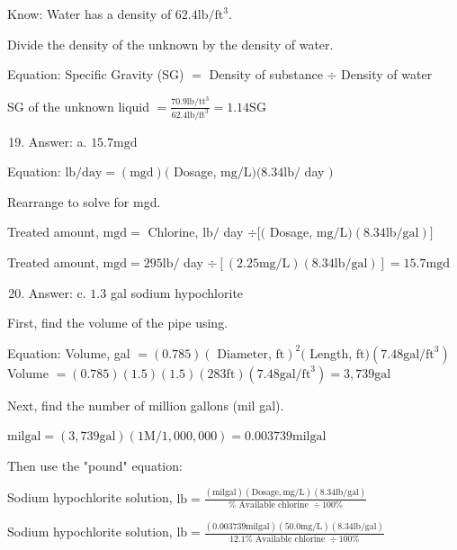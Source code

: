 \documentclass[10pt]{article}
\begin{document}
Know: Water has a density of $62.4 \mathrm{lb} / \mathrm{ft}^{3}$.

Divide the density of the unknown by the density of water.

Equation: Specific Gravity (SG) $=$ Density of substance $\div$ Density of water

SG of the unknown liquid $=\frac{70.9 \mathrm{lb} / \mathrm{tt}^{3}}{62.4 \mathrm{lb} / \mathrm{ft}^{3}}=1.14 \mathrm{SG}$

\begin{enumerate}
  \setcounter{enumi}{18}
  \item Answer: a. $15.7 \mathrm{mgd}$
\end{enumerate}

Equation: $\mathrm{lb} / \mathrm{day}=(\mathrm{mgd})($ Dosage, $\mathrm{mg} / \mathrm{L})(8.34 \mathrm{lb} /$ day $)$

Rearrange to solve for mgd.

Treated amount, $\mathrm{mgd}=$ Chlorine, $\mathrm{lb} /$ day $\div[($ Dosage, $\mathrm{mg} / \mathrm{L})(8.34 \mathrm{lb} / \mathrm{gal})]$

Treated amount, $\mathrm{mgd}=295 \mathrm{lb} /$ day $\div[(2.25 \mathrm{mg} / \mathrm{L})(8.34 \mathrm{lb} / \mathrm{gal})]=15.7 \mathrm{mgd}$

\begin{enumerate}
  \setcounter{enumi}{19}
  \item Answer: c. $1.3$ gal sodium hypochlorite
\end{enumerate}

First, find the volume of the pipe using.

Equation: Volume, gal $=(0.785)(\text { Diameter, } \mathrm{ft})^{2}($ Length, $\mathrm{ft})\left(7.48 \mathrm{gal} / \mathrm{ft}^{3}\right)$ Volume $=(0.785)(1.5)(1.5)(283 \mathrm{ft})\left(7.48 \mathrm{gal} / \mathrm{ft}^{3}\right)=3,739 \mathrm{gal}$

Next, find the number of million gallons (mil gal).

$\mathrm{mil} \mathrm{gal}=(3,739 \mathrm{gal})(1 \mathrm{M} / 1,000,000)=0.003739 \mathrm{mil} \mathrm{gal}$

Then use the "pound" equation:

Sodium hypochlorite solution, $\mathrm{lb}=\frac{(\mathrm{mil} \mathrm{gal})(\mathrm{Dosage}, \mathrm{mg} / \mathrm{L})(8.34 \mathrm{lb} / \mathrm{gal})}{\% \text { Available chlorine } \div 100 \%}$

Sodium hypochlorite solution, $\mathrm{lb}=\frac{(0.003739 \mathrm{mil} \mathrm{gal})(50.0 \mathrm{mg} / \mathrm{L})(8.34 \mathrm{lb} / \mathrm{gal})}{12.1 \% \text { Available chlorine } \div 100 \%}$
\end{document}

